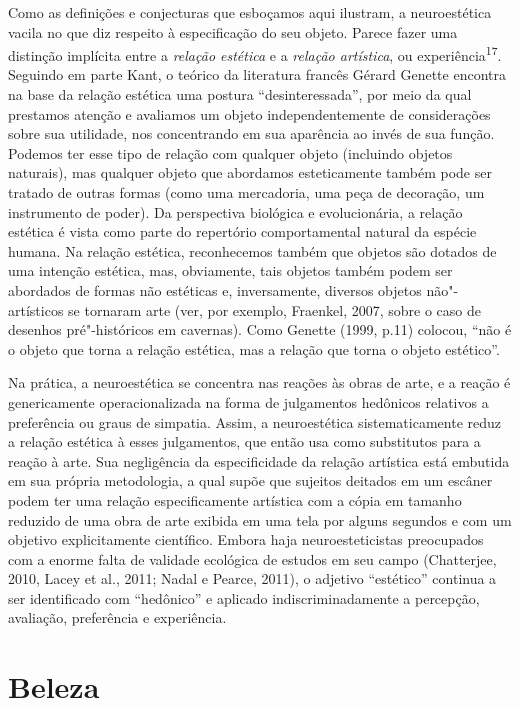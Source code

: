Como as definições e conjecturas que esboçamos aqui ilustram, a
neuroestética vacila no que diz respeito à especificação do seu objeto.
Parece fazer uma distinção implícita entre a \emph{relação estética} e a
\emph{relação artística}, ou experiência\textsuperscript{17}. Seguindo
em parte Kant, o teórico da literatura francês Gérard Genette encontra
na base da relação estética uma postura ``desinteressada'', por meio da
qual prestamos atenção e avaliamos um objeto independentemente de
considerações sobre sua utilidade, nos concentrando em sua aparência ao
invés de sua função. Podemos ter esse tipo de relação com qualquer
objeto (incluindo objetos naturais), mas qualquer objeto que abordamos
esteticamente também pode ser tratado de outras formas (como uma
mercadoria, uma peça de decoração, um instrumento de poder). Da
perspectiva biológica e evolucionária, a relação estética é vista como
parte do repertório comportamental natural da espécie humana. Na relação
estética, reconhecemos também que objetos são dotados de uma intenção
estética, mas, obviamente, tais objetos também podem ser abordados de
formas não estéticas e, inversamente, diversos objetos não"-artísticos se
tornaram arte (ver, por exemplo, Fraenkel, 2007, sobre o caso de
desenhos pré"-históricos em cavernas). Como Genette (1999, p.11) colocou,
``não é o objeto que torna a relação estética, mas a relação que torna o
objeto estético''.

Na prática, a neuroestética se concentra nas reações às obras de arte, e
a reação é genericamente operacionalizada na forma de julgamentos
hedônicos relativos a preferência ou graus de simpatia. Assim, a
neuroestética sistematicamente reduz a relação estética à esses
julgamentos, que então usa como substitutos para a reação à arte. Sua
negligência da especificidade da relação artística está embutida em sua
própria metodologia, a qual supõe que sujeitos deitados em um escâner
podem ter uma relação especificamente artística com a cópia em tamanho
reduzido de uma obra de arte exibida em uma tela por alguns segundos e
com um objetivo explicitamente científico. Embora haja neuroesteticistas
preocupados com a enorme falta de validade ecológica de estudos em seu
campo (Chatterjee, 2010, Lacey et al., 2011; Nadal e Pearce, 2011), o
adjetivo ``estético'' continua a ser identificado com ``hedônico'' e
aplicado indiscriminadamente a percepção, avaliação, preferência e
experiência.

\chapter{Beleza}

